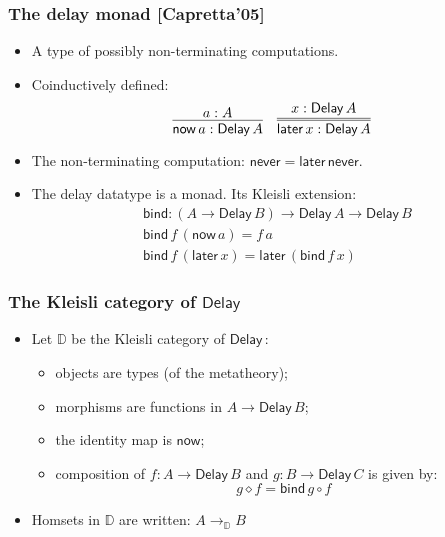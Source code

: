 \documentclass[12pt,t]{beamer}
\newcommand{\comp}{\circ}
\newcommand{\Delay}{\ensuremath{\mathsf{Delay}\,}}
\newcommand{\now}{\mathsf{now}}
\newcommand{\later}{\mathsf{later}}
\newcommand{\never}{\mathsf{never}}
\newcommand{\bind}{\mathsf{bind}}
\newcommand{\D}{\mathbb{D}}
\begin{document}
\begin{frame}

  \frametitle{The delay monad [Capretta'05]}
  \begin{itemize}
  \item A type of possibly non-terminating computations.
  \item Coinductively defined:
    \[
    \infer{\now\,a : \Delay A}{a : A}
    \quad
    \infer={\later\,x : \Delay A}{x : \Delay A}
    \]
  \item The non-terminating computation:
    $\never = \later \,\never$.
  \item The delay datatype is a monad. Its Kleisli extension:
    \begin{align*}
      & \bind : (A \to \Delay B) \to \Delay A \to \Delay B \\
      & \bind \,f \, (\now\,a) = f\,a \\
      & \bind\,f\,(\later\,x) = \later\,(\bind\,f\,x)
    \end{align*}

  \end{itemize}
  
  
\end{frame}

\begin{frame}

  \frametitle{The Kleisli category of $\Delay$}
  \begin{itemize}

  \item Let $\D$ be the Kleisli category of $\Delay$:
    \begin{itemize}
    \item objects are types (of the metatheory);
    \item morphisms are functions in $A \to \Delay B$;
    \item the identity map is $\now$;
    \item composition of $f : A \to \Delay B$ and $g : B \to \Delay C$
      is given by:
      \[g \diamond f = \bind\,g \comp f\]
    \end{itemize}
\item Homsets in $\D$ are written: $A \to_\D B$   
  \end{itemize}
  
\end{frame}
\end{document}
